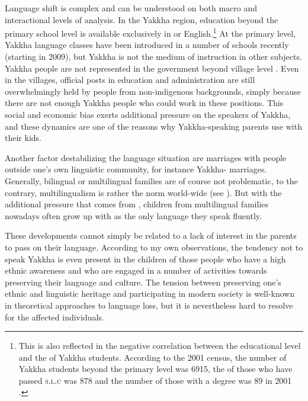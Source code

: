 Language shift is complex and can be understood on both macro and interactional levels of analysis. In the Yakkha region, education beyond the primary school level is available exclusively in  or English.\footnote{This is also reflected in the negative correlation between the educational level and the  of Yakkha students. According to the 2001 census, the number of Yakkha students beyond the primary level was 6915, the  of those who have passed \textsc{s.l.c} was 878 and the number of those with a degree was 89 in 2001 \citep{CBS2001Report}.} At the primary level, Yakkha language classes have been introduced in a number of schools recently (starting in 2009), but Yakkha is not the medium of instruction in other subjects. Yakkha people are not represented in the government beyond village level \citep{CBS2001Report}. Even in the villages, official posts in education and administration are still overwhelmingly held by people from  non-indigenous backgrounds, simply because there are not enough Yakkha people who could work in these positions. This social and economic bias exerts additional pressure on the speakers of Yakkha, and these dynamics are one of the reasons why Yakkha-speaking parents use  with their kids. 


Another factor destabilizing the language situation are marriages with people outside one's  own linguistic community, for instance Yakkha- marriages. Generally, bilingual or multilingual families are of course not problematic, to the contrary, multilingualism is rather the norm world-wide (see \citealt{Turin2007_Diversity}). But with the additional pressure that comes from , children from multilingual families nowadays often grow up with  as the only language they speak fluently. 

These developments cannot simply be related to a lack of interest in the parents to pass on their language. According to my own observations, the tendency not to speak Yakkha is even present in the children of those people who have a high ethnic awareness and who are engaged in a number of activities towards preserving their language and culture. The tension between preserving one's  ethnic and linguistic heritage and participating in modern society is well-known in theoretical approaches to language loss, but it is nevertheless hard to resolve for the affected individuals.

